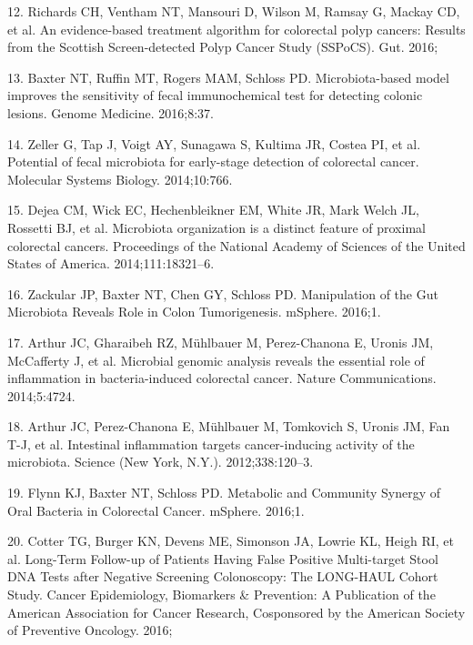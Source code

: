 \documentclass[12pt,]{article}
\begin{document}
\hypertarget{ref-richards_evidence-based_2016}{}
12. Richards CH, Ventham NT, Mansouri D, Wilson M, Ramsay G, Mackay CD,
et al. An evidence-based treatment algorithm for colorectal polyp
cancers: Results from the Scottish Screen-detected Polyp Cancer Study
(SSPoCS). Gut. 2016;

\hypertarget{ref-baxter_microbiota-based_2016}{}
13. Baxter NT, Ruffin MT, Rogers MAM, Schloss PD. Microbiota-based model
improves the sensitivity of fecal immunochemical test for detecting
colonic lesions. Genome Medicine. 2016;8:37.

\hypertarget{ref-zeller_potential_2014}{}
14. Zeller G, Tap J, Voigt AY, Sunagawa S, Kultima JR, Costea PI, et al.
Potential of fecal microbiota for early-stage detection of colorectal
cancer. Molecular Systems Biology. 2014;10:766.

\hypertarget{ref-dejea_microbiota_2014}{}
15. Dejea CM, Wick EC, Hechenbleikner EM, White JR, Mark Welch JL,
Rossetti BJ, et al. Microbiota organization is a distinct feature of
proximal colorectal cancers. Proceedings of the National Academy of
Sciences of the United States of America. 2014;111:18321--6.

\hypertarget{ref-zackular_manipulation_2016}{}
16. Zackular JP, Baxter NT, Chen GY, Schloss PD. Manipulation of the Gut
Microbiota Reveals Role in Colon Tumorigenesis. mSphere. 2016;1.

\hypertarget{ref-arthur_microbial_2014}{}
17. Arthur JC, Gharaibeh RZ, Mühlbauer M, Perez-Chanona E, Uronis JM,
McCafferty J, et al. Microbial genomic analysis reveals the essential
role of inflammation in bacteria-induced colorectal cancer. Nature
Communications. 2014;5:4724.

\hypertarget{ref-arthur_intestinal_2012}{}
18. Arthur JC, Perez-Chanona E, Mühlbauer M, Tomkovich S, Uronis JM, Fan
T-J, et al. Intestinal inflammation targets cancer-inducing activity of
the microbiota. Science (New York, N.Y.). 2012;338:120--3.

\hypertarget{ref-flynn_metabolic_2016}{}
19. Flynn KJ, Baxter NT, Schloss PD. Metabolic and Community Synergy of
Oral Bacteria in Colorectal Cancer. mSphere. 2016;1.

\hypertarget{ref-cotter_long-term_2016}{}
20. Cotter TG, Burger KN, Devens ME, Simonson JA, Lowrie KL, Heigh RI,
et al. Long-Term Follow-up of Patients Having False Positive
Multi-target Stool DNA Tests after Negative Screening Colonoscopy: The
LONG-HAUL Cohort Study. Cancer Epidemiology, Biomarkers \& Prevention: A
Publication of the American Association for Cancer Research, Cosponsored
by the American Society of Preventive Oncology. 2016;
\end{document}
